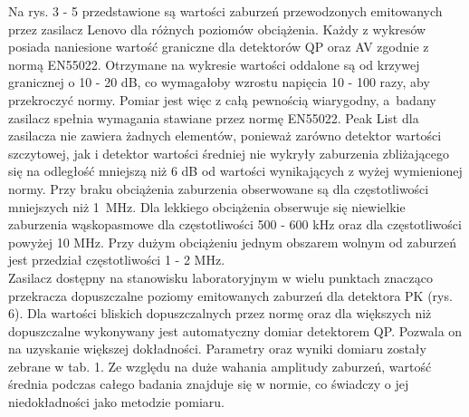 \documentclass[12pt, a4paper, oneside]{article}
\begin{document}
Na rys. 3 - 5 przedstawione są wartości zaburzeń przewodzonych emitowanych przez zasilacz Lenovo dla różnych poziomów obciążenia. Każdy z wykresów posiada naniesione wartość graniczne dla detektorów QP oraz AV zgodnie z normą EN55022. Otrzymane na wykresie wartości oddalone są od krzywej granicznej o 10 - 20 dB, co wymagałoby wzrostu napięcia 10 - 100 razy, aby przekroczyć normy. Pomiar jest więc z całą pewnością wiarygodny, a~badany zasilacz spełnia wymagania stawiane przez normę EN55022. Peak List dla zasilacza nie zawiera żadnych elementów, ponieważ zarówno detektor wartości szczytowej, jak i detektor wartości średniej nie wykryły zaburzenia zbliżającego się na odległość mniejszą niż 6 dB od wartości wynikających z wyżej wymienionej normy. Przy braku obciążenia zaburzenia obserwowane są dla częstotliwości mniejszych niż 1~MHz. Dla lekkiego obciążenia obserwuje się niewielkie zaburzenia wąskopasmowe dla częstotliwości 500 - 600 kHz oraz dla częstotliwości powyżej 10 MHz. Przy dużym obciążeniu jednym obszarem wolnym od zaburzeń jest przedział częstotliwości 1 - 2 MHz.\\
\indent Zasilacz dostępny na stanowisku laboratoryjnym w wielu punktach znacząco przekracza dopuszczalne poziomy emitowanych zaburzeń dla detektora PK (rys. 6). Dla wartości bliskich dopuszczalnych przez normę oraz dla większych niż dopuszczalne wykonywany jest automatyczny domiar detektorem QP. Pozwala on na uzyskanie większej dokładności. Parametry oraz wyniki domiaru zostały zebrane w tab. 1. Ze względu na duże wahania amplitudy zaburzeń, wartość średnia podczas całego badania znajduje się w normie, co świadczy o jej niedokładności jako metodzie pomiaru.
\end{document}
